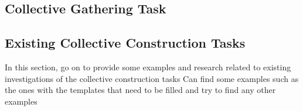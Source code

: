 \subsection{Collective Gathering Task}

\subsection{Existing Collective Construction Tasks}
In this section, go on to provide some examples and research related to existing investigations of the collective construction tasks
Can find some examples such as the ones with the templates that need to be filled and try to find any other examples
